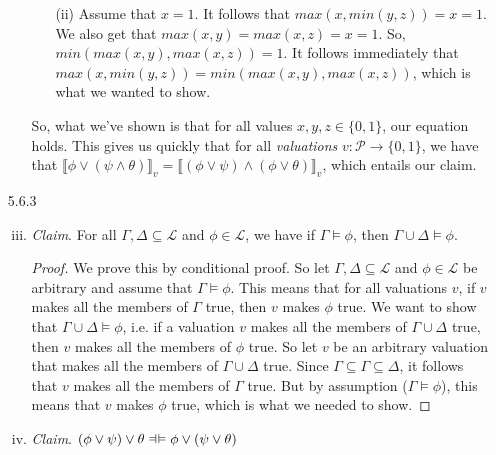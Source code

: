 \begin{enumerate}
\begin{enumerate}[(i)]
\begin{itemize}
              \item[(ii)]  Assume that $x=1$.
                It follows that
                $max(x, min(y,z)) = x=1$.
                We also get that
                $max(x,y) = max(x,z) = x=1$.
                So,
                $min(max(x,y), max(x,z)) = 1$.
                It follows immediately that
                $max(x, min(y,z)) = min(max(x,y), max(x,z))$,
                which is what we wanted to show.
            \end{itemize}
            So, what we've shown is that for all values $x,y,z\in\{0,1\}$, our equation holds.
            This gives us quickly that for all \emph{valuations}
            $v:\mathcal{P}\to\{0,1\}$,
            we have that
            $\llbracket \phi \vee (\psi \wedge \theta) \rrbracket_v = \llbracket(\phi \vee \psi) \wedge (\phi \vee \theta)\rrbracket_v$,
            which entails our claim.

        \end{enumerate}

		\item[5.6.3] 

		\begin{enumerate}[(i)]
		
			\setcounter{enumii}{2}
			
			\item \emph{Claim}. For all $\Gamma,\Delta\subseteq\mathcal{L}$ and $\phi\in\mathcal{L}$, we have if $\Gamma\vDash\phi$, then $\Gamma\cup\Delta\vDash\phi$.
			
			\begin{proof}
			We prove this by conditional proof. So let $\Gamma,\Delta\subseteq\mathcal{L}$ and $\phi\in\mathcal{L}$ be arbitrary and assume that $\Gamma\vDash\phi$. This means that for all valuations $v$, if $v$ makes all the members of $\Gamma$ true, then $v$ makes $\phi$ true. We want to show that $\Gamma\cup\Delta\vDash\phi$, i.e. if a valuation $v$ makes all the members of  $\Gamma\cup\Delta$ true, then $v$ makes all the members of $\phi$ true. So let $v$ be an arbitrary valuation that makes all the members of  $\Gamma\cup\Delta$ true. Since $\Gamma\subseteq\Gamma\subseteq\Delta$, it follows that $v$ makes all the members of $\Gamma$ true. But by assumption ($\Gamma\vDash\phi$), this means that $v$ makes $\phi$ true, which is what we needed to show.
			\end{proof}
		
			\setcounter{enumii}{12}
			
			\item \emph{Claim}. $(\phi\lor\psi)\lor\theta\equi \phi\lor(\psi\lor\theta)$
			

\end{enumerate}
\end{enumerate}
